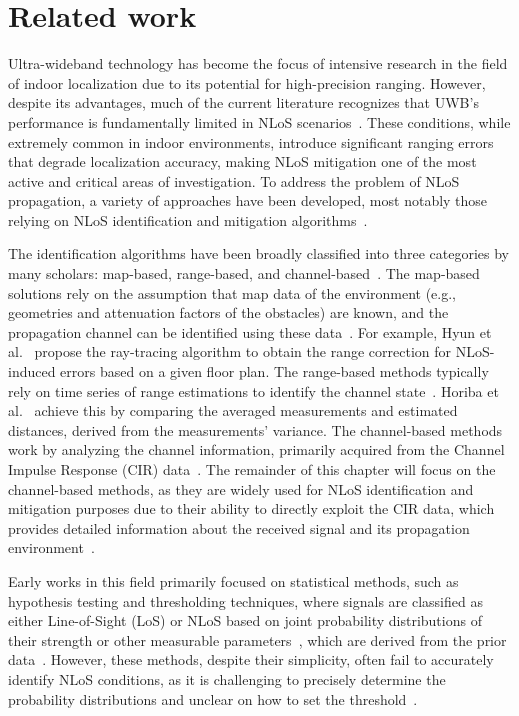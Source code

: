 \chapter{Related work}\label{related_work}

Ultra-wideband technology has become the focus of intensive research in the field of indoor localization due to its potential for high-precision ranging. However, despite its advantages, much of the current literature recognizes that UWB’s performance is fundamentally limited in NLoS scenarios~\cite{wang2025, Elikplim2024survey}. These conditions, while extremely common in indoor environments, introduce significant ranging errors that degrade localization accuracy, making NLoS mitigation one of the most active and critical areas of investigation. To address the problem of NLoS propagation, a variety of approaches have been developed, most notably those relying on NLoS identification and mitigation algorithms~\cite{Wang2023NLoS}. 

The identification algorithms have been broadly classified into three categories by many scholars: map-based, range-based, and channel-based~\cite{khodjaev2010survey}. The map-based solutions rely on the assumption that map data of the environment (e.g., geometries and attenuation factors of the obstacles) are known, and the propagation channel can be identified using these data~\cite{khodjaev2010survey}. For example, Hyun et al.~\cite{hyun2019uwb} propose the ray-tracing algorithm to obtain the range correction for NLoS-induced errors based on a given floor plan. The range-based methods typically rely on time series of range estimations to identify the channel state~\cite{khodjaev2010survey}. Horiba et al.~\cite{horiba2015improved} achieve this by comparing the averaged measurements and estimated distances, derived from the measurements' variance. The channel-based methods work by analyzing the channel information, primarily acquired from the Channel Impulse Response (CIR) data~\cite{khodjaev2010survey, marano2010nlos}. The remainder of this chapter will focus on the channel-based methods, as they are widely used for NLoS identification and mitigation purposes due to their ability to directly exploit the CIR data, which provides detailed information about the received signal and its propagation environment~\cite{Lee2023CIR, pei2024fcn}.

Early works in this field primarily focused on statistical methods, such as hypothesis testing and thresholding techniques, where signals are classified as either Line-of-Sight (LoS) or NLoS based on joint probability distributions of their strength or other measurable parameters~\cite{venkatesh2007non}, which are derived from the prior data~\cite{schroeder2007nlos}. However, these methods, despite their simplicity, often fail to accurately identify NLoS conditions, as it is challenging to precisely determine the probability distributions and unclear on how to set the threshold~\cite{shi2014rss}.

